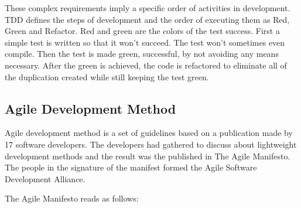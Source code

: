 These complex requirements imply a specific order of activities in development. TDD defines the steps of development and the order of executing them as Red, Green and Refactor. Red and green are the colors of the test success. First a simple test is written so that it won't succeed. The test won't sometimes even compile. Then the test is made green, successful, by not avoiding any means necessary. After the green is achieved, the code is refactored to eliminate all of the duplication created while still keeping the test green.~\cite{beck2003test}

\subsection{Agile Development Method} 
Agile development method is a set of guidelines based on a publication made by 17 software developers. The developers had gathered to discuss about lightweight development methods and the result was the published in The Agile Manifesto. The people in the signature of the manifest formed the Agile Software Development Alliance.

The Agile Manifesto reads as follows:

